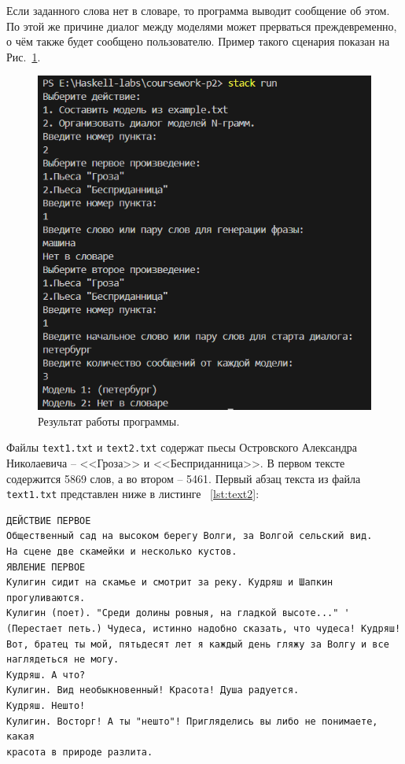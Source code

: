 \documentclass[a4paper, final]{article}
\begin{document}
Если заданного слова нет в словаре, то программа выводит сообщение об этом. По этой же причине диалог между моделями может прерваться преждевременно, о чём также будет сообщено пользователю. Пример такого сценария показан на Рис.~\ref{fig:pic4}.

\newpage
\begin{figure}[H]
	\centering
	\includegraphics[width=0.8 \linewidth]{img/pic4.png}
	\caption{Результат работы программы.}
	\label{fig:pic4}
\end{figure}

Файлы \texttt{text1.txt} и \texttt{text2.txt} содержат пьесы Островского Александра Николаевича -- <<Гроза>> и <<Бесприданница>>. В первом тексте содержится 5869 слов, а во втором -- 5461. Первый абзац текста из файла \texttt{text1.txt} представлен ниже в листинге ~\ref{lst:text2}:

\begin{lstlisting}[caption={Текст произведения <<Гроза>>},stringstyle=\color{black},keywordstyle=\color{black}\bfseries]
ДЕЙСТВИЕ ПЕРВОЕ
Общественный сад на высоком берегу Волги, за Волгой сельский вид. 
На сцене две скамейки и несколько кустов.
ЯВЛЕНИЕ ПЕРВОЕ
Кулигин сидит на скамье и смотрит за реку. Кудряш и Шапкин прогуливаются.
Кулигин (поет). "Среди долины ровныя, на гладкой высоте..." '
(Перестает петь.) Чудеса, истинно надобно сказать, что чудеса! Кудряш! 
Вот, братец ты мой, пятьдесят лет я каждый день гляжу за Волгу и все 
наглядеться не могу.
Кудряш. А что?
Кулигин. Вид необыкновенный! Красота! Душа радуется.
Кудряш. Нешто!
Кулигин. Восторг! А ты "нешто"! Пригляделись вы либо не понимаете, какая 
красота в природе разлита.
\end{lstlisting}
\end{document}
